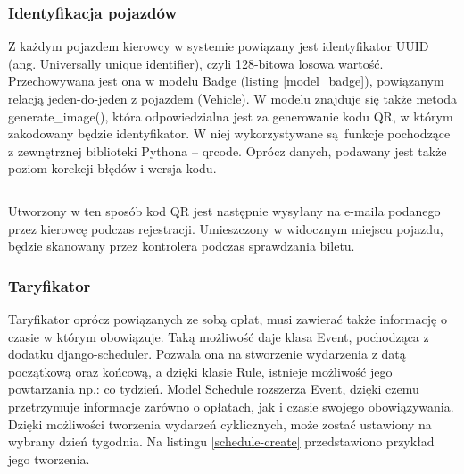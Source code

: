 \subsubsection*{Identyfikacja pojazdów}

Z każdym pojazdem kierowcy w systemie powiązany jest identyfikator UUID (ang. Universally unique identifier), czyli 128-bitowa losowa wartość. Przechowywana jest ona w modelu Badge (listing \ref{model_badge}), powiązanym relacją jeden-do-jeden z pojazdem (Vehicle). W modelu znajduje się także metoda generate\_image(), która odpowiedzialna jest za generowanie kodu QR, w którym zakodowany będzie identyfikator. W niej wykorzystywane są funkcje pochodzące z zewnętrznej biblioteki Pythona -- qrcode. Oprócz danych, podawany jest także poziom korekcji błędów i wersja kodu.

\begin{singlespace}
	\label{model_badge}
	\vspace{0.3cm}
	\inputminted[fontsize=\footnotesize, linenos=true]{python}{src/imp/badges-badge.py}
\end{singlespace}

\vspace{0.3cm}

Utworzony w ten sposób kod QR jest następnie wysyłany na e-maila podanego przez kierowcę podczas rejestracji. Umieszczony w widocznym miejscu pojazdu, będzie skanowany przez kontrolera podczas sprawdzania biletu.

\subsubsection*{Taryfikator}

Taryfikator oprócz powiązanych ze sobą opłat, musi zawierać także informację o czasie w którym obowiązuje. Taką możliwość daje klasa Event, pochodząca z dodatku django-scheduler. Pozwala ona na stworzenie wydarzenia z datą początkową oraz końcową, a dzięki klasie Rule, istnieje możliwość jego powtarzania np.: co tydzień. Model Schedule rozszerza Event, dzięki czemu  przetrzymuje informacje zarówno o opłatach, jak i czasie swojego obowiązywania. Dzięki możliwości tworzenia wydarzeń cyklicznych, może zostać ustawiony na wybrany dzień tygodnia. Na listingu \ref{schedule-create} przedstawiono przykład jego tworzenia.

\begin{singlespace}
	\label{schedule-create}
	\vspace{0.3cm}
	\inputminted[fontsize=\footnotesize, linenos=true]{python}{src/imp/schedule-create.py}
\end{singlespace}


